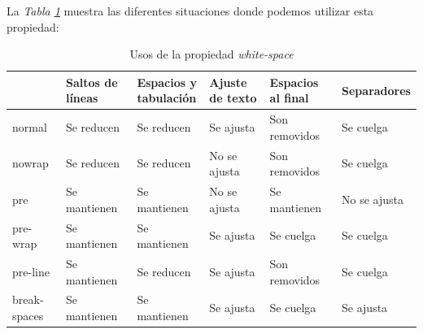 La \textit{Tabla \ref{tab: 2}} muestra las diferentes situaciones donde podemos utilizar esta propiedad:
\begin{table}[H]
    \centering
    \caption{Usos de la propiedad \textit{white-space}}
    \label{tab: 2}
    \begin{tabular}{m{1.7cm} m{2cm} m{2.3cm} m{2cm} m{2cm} m{3cm}}
        \hline
        \parbox{1.7cm}{\raggedright} & \parbox{2cm}{\raggedright\textbf{Saltos de líneas}} & \parbox{2.3cm}{\raggedright\textbf{Espacios y \\tabulación}} & \parbox{2cm}{\raggedright\textbf{Ajuste de texto}} & \parbox{2cm}{\raggedright\textbf{Espacios al final}} & \parbox{3cm}{\raggedright\textbf{Separadores}} \\
        \hline
        \parbox{1.7cm}{\raggedright normal}       & \parbox{2cm}{\raggedright Se reducen} & \parbox{2.3cm}{\raggedright Se reducen} & \parbox{2cm}{\raggedright Se ajusta} & \parbox{2cm}{\raggedright Son removidos} & \parbox{3cm}{\raggedright Se cuelga} \\
        \hline
        \parbox{1.7cm}{\raggedright nowrap}       & \parbox{2cm}{\raggedright Se reducen}    & \parbox{2.3cm}{\raggedright Se reducen}    & \parbox{2cm}{\raggedright No se ajusta}  & \parbox{2cm}{\raggedright Son removidos} & \parbox{3cm}{\raggedright Se cuelga}    \\
        \hline
        \parbox{1.7cm}{\raggedright pre}          & \parbox{2cm}{\raggedright Se mantienen}  & \parbox{2.3cm}{\raggedright Se mantienen}  & \parbox{2cm}{\raggedright No se ajusta}  & \parbox{2cm}{\raggedright Se mantienen}  & \parbox{3cm}{\raggedright No se ajusta} \\
        \hline
        \parbox{1.7cm}{\raggedright pre-wrap}     & \parbox{2cm}{\raggedright Se mantienen}  & \parbox{2.3cm}{\raggedright Se mantienen}  & \parbox{2cm}{\raggedright Se ajusta}     & \parbox{2cm}{\raggedright Se cuelga}     & \parbox{3cm}{\raggedright Se cuelga}    \\
        \hline
        \parbox{1.7cm}{\raggedright pre-line}     & \parbox{2cm}{\raggedright Se mantienen}  & \parbox{2.3cm}{\raggedright Se reducen}    & \parbox{2cm}{\raggedright Se ajusta}     & \parbox{2cm}{\raggedright Son removidos} & \parbox{3cm}{\raggedright Se cuelga}    \\
        \hline
        \parbox{1.7cm}{\raggedright break-spaces} & \parbox{2cm}{\raggedright Se mantienen}  & \parbox{2.3cm}{\raggedright Se mantienen}  & \parbox{2cm}{\raggedright Se ajusta}     & \parbox{2cm}{\raggedright Se cuelga}     & \parbox{3cm}{\raggedright Se ajusta}    \\
        \hline
    \end{tabular}
\end{table}

